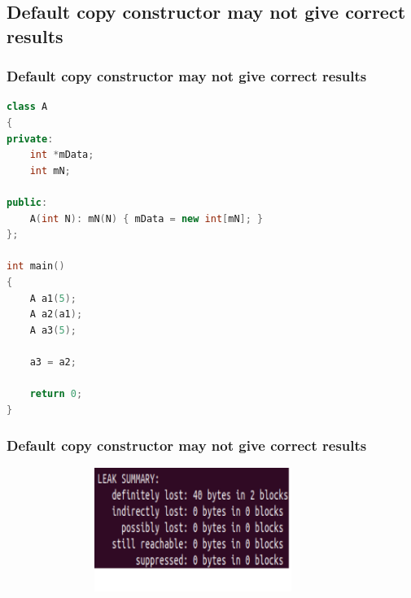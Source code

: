 \documentclass[10pt,xcolor={usenames,dvipsnames}]{beamer}
\begin{document}
\subsection{Default copy constructor may not give correct results}

\begin{frame}[fragile]
	\frametitle{Default copy constructor may not give correct results}
	\begin{center}
		\begin{lstlisting}[language=C++]
class A
{
private:
	int *mData;
	int mN;

public:
	A(int N): mN(N) { mData = new int[mN]; }
};

int main()
{
	A a1(5);
	A a2(a1);
	A a3(5);

	a3 = a2;

	return 0;
}
		\end{lstlisting}
	\end{center}
\end{frame}

\begin{frame}[fragile]
	\frametitle{Default copy constructor may not give correct results}
	\begin{center}
		\begin{figure}
			\includegraphics[height=4cm,width=10cm]{dflt_constructor.png}
		\end{figure}
	\end{center}
\end{frame}
\end{document}
